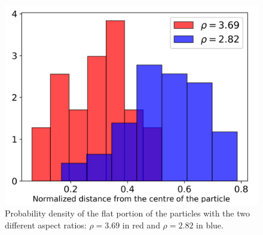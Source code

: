 \documentclass[aip,graphicx]{revtex4-1} %
\begin{document}
\begin{figure}
    \centering
    \includegraphics[width=0.5\columnwidth]{maxlength_div.png}
    \caption{Probability density of the flat portion of the particles with the two different aspect ratios: $\rho=3.69$ in red and $\rho=2.82$ in blue.}\label{fig:maxlength_div}
\end{figure}


\end{document}

